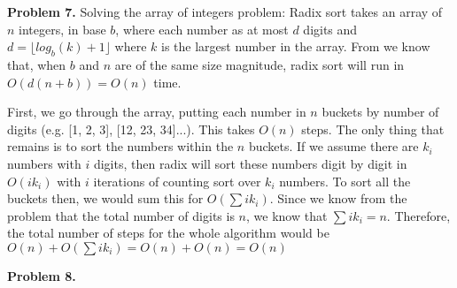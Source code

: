\documentclass{article}
\begin{document}
\hfill

\textbf{Problem 7.} Solving the array of integers problem: Radix sort takes an array of $n$ integers, in base $b$, where each number as at most $d$ digits and $d = \lfloor log_b(k) + 1 \rfloor$ where $k$ is the largest number in the array. From \cite{website:3} we know that, when $b$ and $n$ are of the same size magnitude, radix sort will run in $O(d(n+b)) = O(n)$ time. 

First, we go through the array, putting each number in $n$ buckets by number of digits (e.g. [1, 2, 3], [12, 23, 34]...). This takes $O(n)$ steps. The only thing that remains is to sort the numbers within the $n$ buckets. If we assume there are $k_i$ numbers with $i$ digits, then radix will sort these numbers digit by digit in $O(ik_i)$ with $i$ iterations of counting sort over $k_i$ numbers. To sort all the buckets then, we would sum this for $O(\sum ik_i)$. Since we know from the problem that the total number of digits is $n$, we know that $\sum ik_i = n$. Therefore, the total number of steps for the whole algorithm would be $O(n) + O(\sum ik_i) = O(n) + O(n) = O(n)$

\hfill

\textbf{Problem 8.} 


\newpage
 

\end{document}
